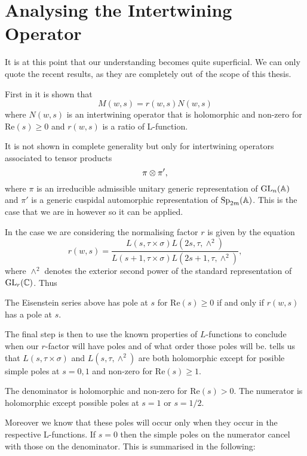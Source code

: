     \section{Analysing the Intertwining Operator}
    It is at this point that our understanding becomes quite superficial. We can only quote the recent results, as they are completely out of the scope of this thesis.
    
    First in \cite[11.1]{cogdellFunctorialityClassicalGroups2004} it is shown that 
    \[M(w, s) = r(w, s)N(w,s)\]
    where \(N(w,s)\) is an intertwining operator that is holomorphic and non-zero for \(\mathrm{Re}(s)\geq 0\) and \(r(w, s)\) is a ratio of L-function.
    \begin{remark}
    	It is not shown in complete generality but only for intertwining operators associated to tensor products
    	\[\pi\otimes \pi',\]
    	where \(\pi\) is an irreducible admissible unitary generic representation of \(\GL_n(\A)\) and \(\pi'\) is a generic cuspidal automorphic representation of \(\Sp_{2m}(\A)\). This is the case that we are in however so it can be applied. 
    \end{remark}
    
     In the case we are considering the normalising factor \(r\) is given by the equation \cite[4A]{jiangPolesCertainResidual2013}
     \[r(w, s) = \frac{L(s, \tau\times \sigma)L(2s, \tau,\wedge^2)}{L(s+1, \tau\times \sigma)L(2s+1, \tau, \wedge^2)},\]
    where \(\wedge^2\) denotes the exterior second power of the standard representation of \(\GL_r(\C)\). Thus

     \begin{Lemma}
        The Eisenstein series above has pole at \(s\) for \(\mathrm{Re}(s)\geq 0\) if and only if \(r(w,s)\) has a pole at \(s\).
     \end{Lemma}
     The final step is then to use the known properties of \(L\)-functions to conclude when our \(r\)-factor will have poles and of what order those poles will be. \cite{jiangPolesCertainResidual2013} tells us that \(L(s, \tau\times \sigma)\) and \(L(s, \tau, \wedge^2)\) are both holomorphic except for posible simple poles at \(s=0, 1\) and non-zero for \(\mathrm{Re}(s)\geq 1\). 
     
     The denominator is holomorphic and non-zero for \(\mathrm{Re}(s)>0\).
	 The numerator is holomorphic except possible poles at \(s= 1\) or \(s=1/2\). 
	 
	 Moreover we know that these poles will occur only when they occur in the respective L-functions. If \(s=0\) then the simple poles on the numerator cancel with those on the denominator. This is summarised in the following:

